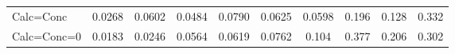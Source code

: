 \begin{tabular}{rrrrrrrrrr}
\multicolumn{1}{l}{Calc=Conc} & \multicolumn{1}{c}{0.0268} & \multicolumn{1}{c}{0.0602} & \multicolumn{1}{c}{0.0484} & \multicolumn{1}{c}{0.0790} & \multicolumn{1}{c}{0.0625} & \multicolumn{1}{c}{0.0598} & \multicolumn{1}{c}{0.196} & \multicolumn{1}{c}{0.128} & \multicolumn{1}{c}{0.332} \\
\multicolumn{1}{l}{Calc=Conc=0} & \multicolumn{1}{c}{0.0183} & \multicolumn{1}{c}{0.0246} & \multicolumn{1}{c}{0.0564} & \multicolumn{1}{c}{0.0619} & \multicolumn{1}{c}{0.0762} & \multicolumn{1}{c}{0.104} & \multicolumn{1}{c}{0.377} & \multicolumn{1}{c}{0.206} & \multicolumn{1}{c}{0.302} \\
\bottomrule
\end{tabular}%
